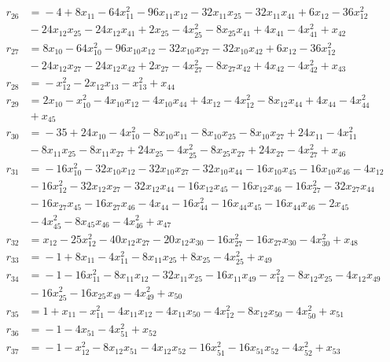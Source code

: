 \begin{align*}
r_{26} &={}-4 +8x_{11} -64x_{11}^{2} -96x_{11}x_{12} -32x_{11}x_{25} -32x_{11}x_{41} +6x_{12} -36x_{12}^{2} \\
&{}-24x_{12}x_{25} -24x_{12}x_{41} +2x_{25} -4x_{25}^{2} -8x_{25}x_{41} +4x_{41} -4x_{41}^{2} +x_{42} \\
r_{27} &={}8x_{10} -64x_{10}^{2} -96x_{10}x_{12} -32x_{10}x_{27} -32x_{10}x_{42} +6x_{12} -36x_{12}^{2} \\
&{}-24x_{12}x_{27} -24x_{12}x_{42} +2x_{27} -4x_{27}^{2} -8x_{27}x_{42} +4x_{42} -4x_{42}^{2} +x_{43} \\
r_{28} &={}-x_{12}^{2} -2x_{12}x_{13} -x_{13}^{2} +x_{44} \\
r_{29} &={}2x_{10} -x_{10}^{2} -4x_{10}x_{12} -4x_{10}x_{44} +4x_{12} -4x_{12}^{2} -8x_{12}x_{44} +4x_{44} -4x_{44}^{2} \\
&{}+x_{45} \\
r_{30} &={}-35 +24x_{10} -4x_{10}^{2} -8x_{10}x_{11} -8x_{10}x_{25} -8x_{10}x_{27} +24x_{11} -4x_{11}^{2} \\
&{}-8x_{11}x_{25} -8x_{11}x_{27} +24x_{25} -4x_{25}^{2} -8x_{25}x_{27} +24x_{27} -4x_{27}^{2} +x_{46} \\
r_{31} &={}-16x_{10}^{2} -32x_{10}x_{12} -32x_{10}x_{27} -32x_{10}x_{44} -16x_{10}x_{45} -16x_{10}x_{46} -4x_{12} \\
&{}-16x_{12}^{2} -32x_{12}x_{27} -32x_{12}x_{44} -16x_{12}x_{45} -16x_{12}x_{46} -16x_{27}^{2} -32x_{27}x_{44} \\
&{}-16x_{27}x_{45} -16x_{27}x_{46} -4x_{44} -16x_{44}^{2} -16x_{44}x_{45} -16x_{44}x_{46} -2x_{45} \\
&{}-4x_{45}^{2} -8x_{45}x_{46} -4x_{46}^{2} +x_{47} \\
r_{32} &={}x_{12} -25x_{12}^{2} -40x_{12}x_{27} -20x_{12}x_{30} -16x_{27}^{2} -16x_{27}x_{30} -4x_{30}^{2} +x_{48} \\
r_{33} &={}-1 +8x_{11} -4x_{11}^{2} -8x_{11}x_{25} +8x_{25} -4x_{25}^{2} +x_{49} \\
r_{34} &={}-1 -16x_{11}^{2} -8x_{11}x_{12} -32x_{11}x_{25} -16x_{11}x_{49} -x_{12}^{2} -8x_{12}x_{25} -4x_{12}x_{49} \\
&{}-16x_{25}^{2} -16x_{25}x_{49} -4x_{49}^{2} +x_{50} \\
r_{35} &={}1 +x_{11} -x_{11}^{2} -4x_{11}x_{12} -4x_{11}x_{50} -4x_{12}^{2} -8x_{12}x_{50} -4x_{50}^{2} +x_{51} \\
r_{36} &={}-1 -4x_{51} -4x_{51}^{2} +x_{52} \\
r_{37} &={}-1 -x_{12}^{2} -8x_{12}x_{51} -4x_{12}x_{52} -16x_{51}^{2} -16x_{51}x_{52} -4x_{52}^{2} +x_{53} \\

\end{align*}
